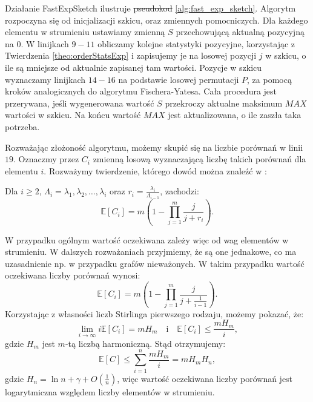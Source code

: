     Działanie FastExpSketch ilustruje \sout{pseudokod}  \ref{alg:fast_exp_sketch}. Algorytm rozpoczyna się od inicjalizacji szkicu, oraz zmiennych pomocniczych. Dla każdego elementu w strumieniu ustawiamy zmienną $S$ przechowującą aktualną pozycyjną na $0$. W linijkach $9-11$ obliczamy kolejne statystyki pozycyjne, korzystając z Twierdzenia \ref{theo:orderStatsExp} i zapisujemy je na losowej pozycji $j$ w szkicu, o ile są mniejsze od aktualnie zapisanej tam wartości. Pozycje w  szkicu wyznaczamy linijkach $14-16$ na podstawie losowej permutacji $P$, za pomocą kroków analogicznych do algorytmu Fischera-Yatesa. Cała procedura jest przerywana, jeśli wygenerowana wartość $S$ przekroczy aktualne maksimum $MAX$ wartości w szkicu. Na końcu wartość $MAX$ jest aktualizowana, o ile zaszła taka potrzeba.

    Rozważając złożoność algorytmu, możemy skupić się na liczbie porównań w linii $19$. Oznaczmy przez $C_i$ zmienną losową wyznaczającą liczbę takich porównań dla elementu $i$. Rozważymy twierdzenie, którego dowód można znaleźć w \cite{Lemiesz_2023}:
    \begin{twierdzenie}
        \label{theo:avgComp}        
        Dla $i \geq 2$, $\Lambda_{i} = \lambda_{1}, \lambda_{2}, \dots, \lambda_{i}$ oraz $r_i = \frac{\lambda_{i}}{\Lambda_{i - 1}}$, zachodzi:
        \[
            \mathbb{E}[C_i] = m \left( 1 - \prod_{j = 1}^{m} \frac{j}{j + r_i} \right).   
        \]
    \end{twierdzenie}
    W przypadku ogólnym wartość oczekiwana zależy więc od wag elementów w strumieniu. W dalszych rozważaniach przyjmiemy, że są one jednakowe, co ma uzasadnienie np. w przypadku grafów nieważonych. W takim przypadku wartość oczekiwana liczby porównań wynosi: 
    \[
        \mathbb{E}[C_i] = m \left( 1 - \prod_{j = 1}^{m} \frac{j}{j + \frac{1}{i - 1}} \right) .
    \]
    Korzystając z własności liczb Stirlinga pierwszego rodzaju, możemy pokazać, że:
    \[
        \lim_{i \to \infty} i \mathbb{E}[C_i] = m H_m \quad \text{i} \quad \mathbb{E}[C_i] \leq \frac{m H_m}{i},
    \]
    gdzie $H_m$ jest $m$-tą liczbą harmoniczną. Stąd otrzymujemy:
    \[
        \mathbb{E}[C] \leq \sum\limits_{i = 1}^{n} \frac{m H_m}{i} = m H_m H_n,
    \]
    gdzie $H_n = \ln n + \gamma + O(\frac{1}{n})$, więc wartość oczekiwana liczby porównań jest logarytmiczna względem liczby elementów w strumieniu.

